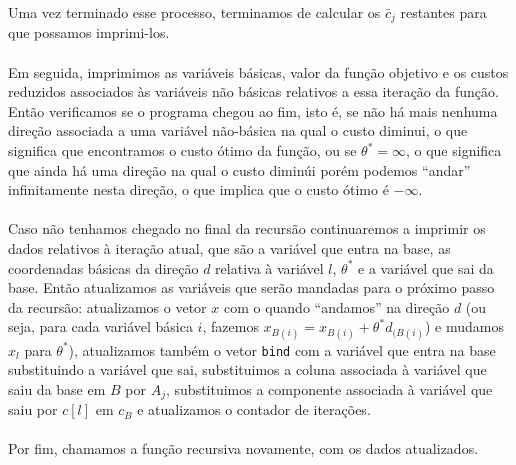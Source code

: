 \documentclass[a4paper]{article}
\begin{document}
Uma vez terminado esse processo, terminamos de calcular os $\bar{c}_{j}$ restantes para que possamos imprimi-los.\paragraph{}
Em seguida, imprimimos as variáveis básicas, valor da função objetivo e os custos reduzidos associados às variáveis não básicas relativos a essa iteração da função. Então verificamos se o programa chegou ao fim, isto é, se não há mais nenhuma direção associada a uma variável não-básica na qual o custo diminui, o que significa que encontramos o custo ótimo da função, ou se $\theta^* = \infty$, o que significa que ainda há uma direção na qual o custo diminúi porém podemos ``andar'' infinitamente nesta direção, o que implica que o custo ótimo é $-\infty$.\paragraph{}
Caso não tenhamos chegado no final da recursão continuaremos a imprimir os dados relativos à iteração atual, que são a variável que entra na base, as coordenadas básicas da direção $d$ relativa à variável $l$, $\theta^*$ e a variável que sai da base. Então atualizamos as variáveis que serão mandadas para o próximo passo da recursão: atualizamos o vetor $x$ com o quando ``andamos'' na direção $d$ (ou seja, para cada variável básica $i$, fazemos $x_{B(i)} = x_{B(i)} +\theta^*d_{(B(i)}$) e mudamos $x_{l}$ para $\theta^*$), atualizamos também o vetor \texttt{bind} com a variável que entra na base substituindo a variável que sai, substituimos a coluna associada à variável que saiu da base em $B$ por $A_{j}$, substituimos a componente associada à variável que saiu por $c[l]$ em $c_{B}$ e atualizamos o contador de iterações.\paragraph{}
Por fim, chamamos a função recursiva novamente, com os dados atualizados.\paragraph{}
\end{document}
